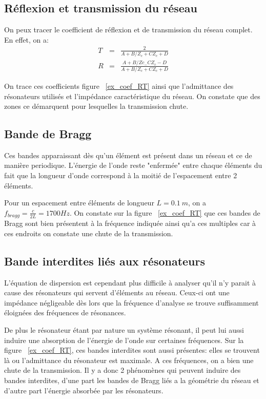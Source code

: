 \subsection{Réflexion et transmission du réseau}
On peux tracer le coefficient de réflexion et de transmission du réseau complet. En effet, on a:
\begin{eqnarray}
T & = & \frac{2}{A + B/Z_c + C Z_c + D} \\
R & = & \frac{A + B / Zc_ - C Z_c -D}{A + B/Z_c + C Z_c + D} 
\end{eqnarray}

On trace ces coefficients figure ~\ref{ex_coef_RT} ainsi que l'admittance des résonateurs utilisés et l'impédance caractéristique du réseau. On constate que des zones ce démarquent pour lesquelles  la transmission chute.

\subsection{Bande de Bragg}
Ces bandes apparaissant dès qu'un élément est présent dans un réseau et ce de manière periodique. L'énergie de l'onde reste "enfermée" entre chaque éléments du fait que la longueur d'onde correspond à la moitié de l'espacement entre 2 éléments. 

Pour un espacement entre éléments de longueur $L=0.1~m$, on a $f_{bragg} = \frac{c}{2L} = 1700 Hz$. On constate sur la figure ~\ref{ex_coef_RT} que ces bandes de Bragg sont bien présentent à la fréquence indiquée ainsi qu'a ces multiples car à ces endroits on constate une chute de la transmission.
 

\subsection{Bande interdites liés aux résonateurs}
L'équation de dispersion est cependant plus difficile à analyser qu'il n'y parait à cause des résonateurs qui servent d’éléments au réseau. Ceux-ci ont une impédance négligeable dès lors que la fréquence d'analyse se trouve suffisamment éloignées des fréquences de résonances. 

De plus le résonateur étant par nature un système résonant, il peut lui aussi induire une absorption de l'énergie de l'onde sur certaines fréquences. Sur la figure ~\ref{ex_coef_RT}, ces bandes interdites sont aussi présentes: elles se trouvent là ou l'admittance du résonateur est maximale. A ces fréquences, on a bien une chute de la transmission.
 \bigskip
Il y a donc 2 phénomènes qui peuvent induire des bandes interdites, d'une part les bandes de Bragg liés a la géométrie du réseau et d'autre part l'énergie absorbée par les résonateurs.

